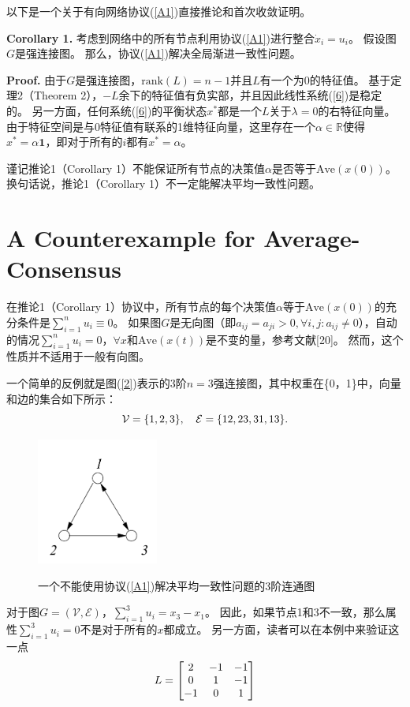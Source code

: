 \documentclass{article}
\begin{document}
以下是一个关于有向网络协议(\ref{A1})直接推论和首次收敛证明。

\noindent \textbf{Corollary 1.} 考虑到网络中的所有节点利用协议(\ref{A1})进行整合$\dot{x}_i = u_i$。
假设图$G$是强连接图。
那么，协议(\ref{A1})解决全局渐进一致性问题。

\noindent \textbf{Proof.} 由于$G$是强连接图，$\text{rank}(L)=n-1$并且$L$有一个为0的特征值。
基于定理2（Theorem 2），$-L$余下的特征值有负实部，并且因此线性系统(\ref{6})是稳定的。
另一方面，任何系统(\ref{6})的平衡状态$x^*$都是一个$L$关于$\lambda=0$的右特征向量。
由于特征空间是与0特征值有联系的1维特征向量，这里存在一个$\alpha\in \mathbb{R}$使得$x^*=\alpha\mathbf{1}$，即对于所有的$i$都有$x^*=\alpha$。

谨记推论1（Corollary 1）不能保证所有节点的决策值$\alpha$是否等于$\text{Ave}(x(0))$。
换句话说，推论1（Corollary 1）不一定能解决平均一致性问题。


\section{A Counterexample for Average-Consensus}
在推论1（Corollary 1）协议中，所有节点的每个决策值$\alpha$等于$\text{Ave}(x(0))$的充分条件是$\sum_{i=1}^{n}u_i \equiv 0$。
如果图$G$是无向图（即$a_{ij}=a_{ji} > 0,\forall i,j: a_{ij}\ne 0$），自动的情况$\sum_{i=1}^{n}u_i=0$，$\forall x$和$\text{Ave}(x(t))$是不变的量，参考文献[20]。
然而，这个性质并不适用于一般有向图。

一个简单的反例就是图(\ref{2})表示的3阶$n=3$强连接图，其中权重在\{0，1\}中，向量和边的集合如下所示：
\begin{equation}
    \mathcal{V} = \{1, 2, 3 \},\quad \mathcal{E}=\{12, 23, 31, 13\}.
    \notag
\end{equation}
\begin{figure}[htbp]
    \centering
    \includegraphics[width=4cm]{figures/Fig2-ConnectedDigraph.jpeg}
    \label{ConnectedDigraph}
    \caption{一个不能使用协议(\ref{A1})解决平均一致性问题的3阶连通图}
\end{figure}

对于图$G=(\mathcal{V}, \mathcal{E})$，$\sum_{i=1}^{3}u_i = x_3 - x_1$。
因此，如果节点1和3不一致，那么属性$\sum_{i=1}^{3}u_i = 0$不是对于所有的$x$都成立。
另一方面，读者可以在本例中来验证这一点
\begin{equation}
    L = \left[
    \begin{matrix}
        2 & -1 & -1 \\
        0 & 1 & -1 \\
        -1 & 0 & 1 
    \end{matrix}
    \right]
    \notag
\end{equation}
\end{document}
